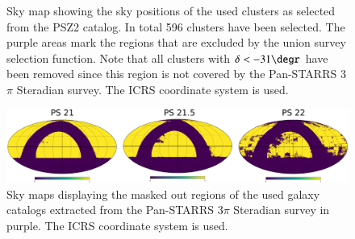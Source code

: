 \documentclass[iop, apjl, twocolappendix, numberedappendix]{emulateapj}
\begin{document}
\begin{figure}
\caption{Sky map showing the sky positions of the used clusters as
selected from the PSZ2 catalog. In total 596 clusters have been
selected. The purple areas mark the regions that are excluded by the
union survey selection function. Note that all clusters with
$\delta<-31\degr$ have been removed since this region is not covered
by the Pan-STARRS 3$\pi$ Steradian survey. The ICRS coordinate
system is used.}
    \label{fig:planck_fig} 
\end{figure}

\begin{figure}
    \includegraphics[width= \textwidth]{heal_maps.png}
\caption{Sky maps displaying the masked out regions of the used
galaxy catalogs extracted from the Pan-STARRS 3$\pi$ Steradian
survey in purple. The ICRS coordinate system is used.}
   \label{fig:heal_map} 
\end{figure}
\end{document}
